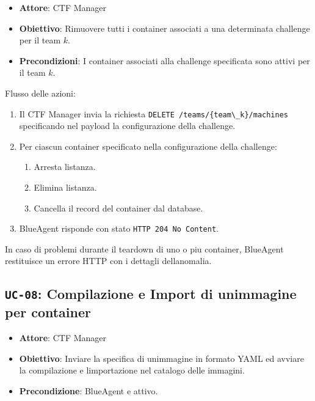 \begin{itemize}
\tightlist
\item
  \textbf{Attore}: CTF Manager
\item
  \textbf{Obiettivo}: Rimuovere tutti i container associati a una
  determinata challenge per il team \(k\).
\item
  \textbf{Precondizioni}: I container associati alla challenge
  specificata sono attivi per il team \(k\).
\end{itemize}

Flusso delle azioni:

\begin{enumerate}
\def\labelenumi{\arabic{enumi}.}
\tightlist
\item
  Il CTF Manager invia la richiesta
  \passthrough{\lstinline!DELETE /teams/\{team\_k\}/machines!}
  specificando nel payload la configurazione della challenge.
\item
  Per ciascun container specificato nella configurazione della
  challenge:

  \begin{enumerate}
  \def\labelenumii{\arabic{enumii}.}
  \tightlist
  \item
    Arresta l\textquotesingle istanza.
  \item
    Elimina l\textquotesingle istanza.
  \item
    Cancella il record del container dal database.
  \end{enumerate}
\item
  BlueAgent risponde con stato
  \passthrough{\lstinline!HTTP 204 No Content!}.
\end{enumerate}

In caso di problemi durante il teardown di uno o piu container,
BlueAgent restituisce un errore HTTP con i dettagli
dell\textquotesingle anomalia.

\subsection{\texorpdfstring{\texttt{UC-08}: Compilazione e Import di
un\textquotesingle immagine per
container}{UC-08: Compilazione e Import di un\textquotesingle immagine per container}}\label{uc-08-compilazione-e-import-di-unimmagine-per-container}

\begin{itemize}
\tightlist
\item
  \textbf{Attore}: CTF Manager
\item
  \textbf{Obiettivo}: Inviare la specifica di
  un\textquotesingle immagine in formato YAML ed avviare la compilazione
  e l\textquotesingle importazione nel catalogo delle immagini.
\item
  \textbf{Precondizione}: BlueAgent e\textquotesingle{} attivo.
\end{itemize}


